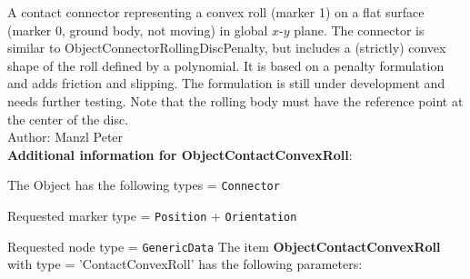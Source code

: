 %
\newpage

\label{sec:item:ObjectContactConvexRoll}
A contact connector representing a convex roll (marker 1) on a flat surface (marker 0, ground body, not moving) in global $x$-$y$ plane. The connector is similar to ObjectConnectorRollingDiscPenalty, but includes a (strictly) convex shape of the roll defined by a polynomial. It is based on a penalty formulation and adds friction and slipping. The formulation is still under development and needs further testing. Note that the rolling body must have the reference point at the center of the disc.\vspace{12pt}
 \\\noindent Author: Manzl Peter
\vspace{12pt}
 \\{\bf Additional information for ObjectContactConvexRoll}:
\bi
  \item The Object has the following types = \texttt{Connector}
  \item Requested marker type = \texttt{Position} + \texttt{Orientation}
  \item Requested node type = \texttt{GenericData}
\ei
\vspace{12pt} \noindent The item {\bf ObjectContactConvexRoll} with type = 'ContactConvexRoll' has the following parameters:\vspace{-1cm}\\ 
